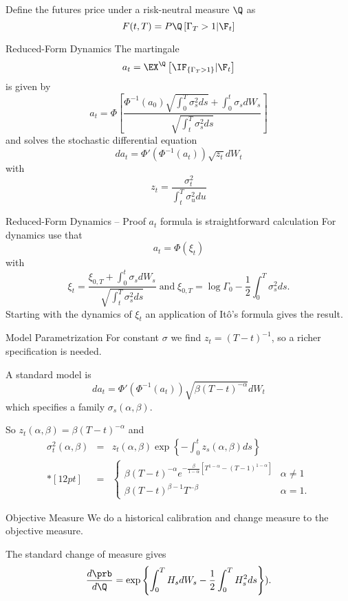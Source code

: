 	Define the futures price under a risk-neutral measure $\Q$ as
		$$
		F(t,T) = P \Q\left[\Gamma_T>1 |\F_t\right]
		$$


Reduced-Form Dynamics
	The martingale
		$$
		a_t = \EX^\Q\left[\IF_{\{\Gamma_T>1\}} |\F_t\right]
		$$
		is given by
		$$
		a_t= \Phi \left[\frac{\Phi^{-1}(a_0) \sqrt{\int_0^T \sigma^2_s ds}+\int_0^t \sigma_s dW_s}{\sqrt{\int_t^T \sigma^2_s ds}}\right]
		$$
	and solves the stochastic differential equation
		$$
		da_t = \Phi'\left(\Phi^{-1}(a_t)\right)\sqrt{z_t}dW_t
		$$
		with
		$$
		z_t=\frac{\sigma_t^2}{\int_t^T \sigma^2_u du}
		$$


Reduced-Form Dynamics -- Proof
	$a_t$ formula is straightforward calculation
	For dynamics use that
			$$
			a_t = \Phi(\xi_t)
			$$
		with
			$$
			\xi_t = \frac{\xi_{0,T}+\int_0^t\sigma_s dW_s}{\sqrt{\int_t^T\sigma_s^2ds}}\; \mbox{and}\;  \xi_{0,T}=\log \Gamma_0 - \frac{1}{2} \int_0^T\sigma_s^2ds.
			$$
	Starting with the dynamics of $\xi_t$ an application of It{\^o}'s formula gives the result.


Model Parametrization
	For constant $\sigma$ we find $z_t=(T-t)^{-1}$, so a richer specification is needed.
	
	A standard model is
		$$
		da_t = \Phi'\left(\Phi^{-1}(a_t)\right)\sqrt{\beta(T-t)^{-\alpha}}dW_t
		$$
	which specifies a family $\sigma_s(\alpha,\beta)$.

	So $z_t(\alpha, \beta) = \beta(T-t)^{-\alpha}$ and
		$$
		\begin{array}{lll}
		\sigma_t^2(\alpha,\beta)&=& \displaystyle z_t(\alpha, \beta) \exp\left\{-\int_0^t z_s(\alpha, \beta) ds \right\}\\*[12pt]
		&=&\displaystyle
		\left\{
		\begin{array}{ll}
		\beta(T-t)^{-\alpha} e^{-\frac{\beta}{1-\alpha}[T^{1-\alpha}-(T-1)^{1-\alpha}]} &\alpha \not=1\\
		\beta(T-t)^{\beta-1}T^{-\beta} &\alpha=1.
		\end{array}
		\right.
		\end{array}
		$$


Objective Measure
	We do a historical calibration and change measure to the objective measure.
	
	The standard change of measure gives
		$$
		\frac{d\prb}{d\Q} = \exp\left\{\int_0^T H_s dW_s -\frac{1}{2} \int_0^T H_s^2ds \right\}).
		$$

